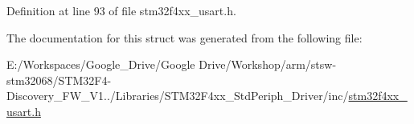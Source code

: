 Definition at line 93 of file stm32f4xx\-\_\-usart.\-h.



The documentation for this struct was generated from the following file\-:\begin{DoxyCompactItemize}
\item 
E\-:/\-Workspaces/\-Google\-\_\-\-Drive/\-Google Drive/\-Workshop/arm/stsw-\/stm32068/\-S\-T\-M32\-F4-\/\-Discovery\-\_\-\-F\-W\-\_\-\-V1../\-Libraries/\-S\-T\-M32\-F4xx\-\_\-\-Std\-Periph\-\_\-\-Driver/inc/\hyperlink{stm32f4xx__usart_8h}{stm32f4xx\-\_\-usart.\-h}\end{DoxyCompactItemize}
